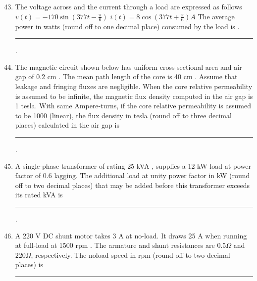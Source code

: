 \documentclass[journal]{IEEEtran}
\begin{document}
\begin{enumerate}
		\setcounter{enumi}{42} 

 
    \item  The voltage across and the current through a load are expressed as follows
$v(t)=-170 \sin (377 t-\frac{\pi}{6}) $
$i(t)=8 \cos (377 t+\frac{\pi}{6}) {A}$
The average power in watts (round off to one decimal place) consumed by the load is
.\rule{1cm}{0.15mm}.
\hfill{}
 
  \item  The magnetic circuit shown below has uniform cross-sectional area and air gap of 0.2 cm . The mean path length of the core is 40 cm . Assume that leakage and fringing fluxes are negligible. When the core relative permeability is assumed to be infinite, the magnetic flux density computed in the air gap is 1 tesla. With same Ampere-turns, if the core relative permeability is assumed to be 1000 (linear), the flux density in tesla (round off to three decimal places) calculated in the air gap is \rule{1cm}{0.15mm}.
  
  \hfill{}

 
  
  \item  A single-phase transformer of rating 25 kVA , supplies a 12 kW load at power factor of 0.6 lagging. The additional load at unity power factor in kW (round off to two decimal places) that may be added before this transformer exceeds its rated kVA is \rule{1cm}{0.15mm}.
\hfill{}

\item A 220 V DC shunt motor takes 3 A at no-load. It draws 25 A when running at full-load at 1500 rpm . The armature and shunt resistances are $0.5 \Omega$ and $220 \Omega$, respectively. The noload speed in rpm (round off to two decimal places) is \rule{1cm}{0.15mm} 
    \hfill{}
    

\end{enumerate}
\end{document}
